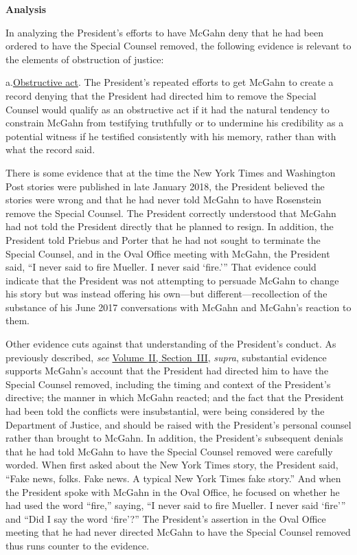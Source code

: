 \begin{center}
\textbf{Analysis}
\end{center}

In analyzing the President's efforts to have McGahn deny that he had been ordered to have the Special Counsel removed, the following evidence is relevant to the elements of obstruction of justice:

a.\qquad\underline{Obstructive act}.
The President's repeated efforts to get McGahn to create a record denying that the President had directed him to remove the Special Counsel would qualify as an obstructive act if it had the natural tendency to constrain McGahn from testifying truthfully or to undermine his credibility as a potential witness if he testified consistently with his memory, rather than with what the record said.

There is some evidence that at the time the New York Times and Washington Post stories were published in late January 2018, the President believed the stories were wrong and that he had never told McGahn to have Rosenstein remove the Special Counsel.
The President correctly understood that McGahn had not told the President directly that he planned to resign.
In addition, the President told Priebus and Porter that he had not sought to terminate the Special Counsel, and in the Oval Office meeting with McGahn, the President said, ``I never said to fire Mueller.
I never said `fire.'\thinspace''
That evidence could indicate that the President was not attempting to persuade McGahn to change his story but was instead offering his own---but different---recollection of the substance of his June 2017 conversations with McGahn and McGahn's reaction to them.

Other evidence cuts against that understanding of the President's conduct.
As previously described, \textit{see} \hyperlink{section.2.3}{Volume~II, Section~III}, \textit{supra}, substantial evidence supports McGahn's account that the President had directed him to have the Special Counsel removed, including the timing and context of the President's directive;
the manner in which McGahn reacted;
and the fact that the President had been told the conflicts were insubstantial, were being considered by the Department of Justice, and should be raised with the President's personal counsel rather than brought to McGahn.
In addition, the President's subsequent denials that he had told McGahn to have the Special Counsel removed were carefully worded.
When first asked about the New York Times story, the President said, ``Fake news, folks.
Fake news.
A typical New York Times fake story.'' And when the President spoke with McGahn in the Oval Office, he focused on whether he had used the word ``fire,'' saying, ``I never said to fire Mueller.  I never said `fire'\thinspace'' and ``Did I say the word `fire'?'' The President's assertion in the Oval Office meeting that he had never directed McGahn to have the Special Counsel removed thus runs counter to the evidence.

